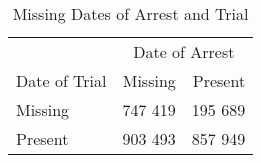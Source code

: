 \begin{table}[t]

\caption{\label{tab:missing_date_of_arrest_process}Missing Dates of Arrest and Trial}
\centering
\begin{tabular}{lrr}
\toprule
\multicolumn{1}{c}{ } & \multicolumn{2}{c}{Date of Arrest} \\
\cmidrule(l{2pt}r{2pt}){2-3}
Date of Trial & Missing & Present\\
\midrule
Missing & 747 419 & 195 689\\
Present & 903 493 & 857 949\\
\bottomrule
\end{tabular}
\end{table}